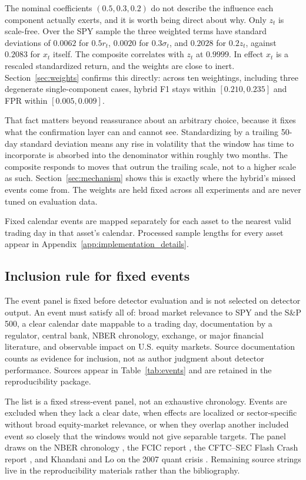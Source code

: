 \documentclass[pdflatex,sn-mathphys-num,iicol]{sn-jnl}
\begin{document}
The nominal coefficients $(0.5,0.3,0.2)$ do not describe the influence each component actually exerts, and it is worth being direct about why. Only $z_t$ is scale-free. Over the SPY sample the three weighted terms have standard deviations of $0.0062$ for $0.5r_t$, $0.0020$ for $0.3\sigma_t$, and $0.2028$ for $0.2z_t$, against $0.2083$ for $x_t$ itself. The composite correlates with $z_t$ at $0.9999$. In effect $x_t$ is a rescaled standardized return, and the weights are close to inert. Section~\ref{sec:weights} confirms this directly: across ten weightings, including three degenerate single-component cases, hybrid F1 stays within $[0.210, 0.235]$ and FPR within $[0.005, 0.009]$.

That fact matters beyond reassurance about an arbitrary choice, because it fixes what the confirmation layer can and cannot see. Standardizing by a trailing 50-day standard deviation means any rise in volatility that the window has time to incorporate is absorbed into the denominator within roughly two months. The composite responds to moves that outrun the trailing scale, not to a higher scale as such. Section~\ref{sec:mechanism} shows this is exactly where the hybrid's missed events come from. The weights are held fixed across all experiments and are never tuned on evaluation data.

Fixed calendar events are mapped separately for each asset to the nearest valid trading day in that asset's calendar. Processed sample lengths for every asset appear in Appendix~\ref{app:implementation_details}.

\subsection{Inclusion rule for fixed events}
The event panel is fixed before detector evaluation and is not selected on detector output. An event must satisfy all of: broad market relevance to SPY and the S\&P 500, a clear calendar date mappable to a trading day, documentation by a regulator, central bank, NBER chronology, exchange, or major financial literature, and observable impact on U.S. equity markets. Source documentation counts as evidence for inclusion, not as author judgment about detector performance. Sources appear in Table~\ref{tab:events} and are retained in the reproducibility package.

The list is a fixed stress-event panel, not an exhaustive chronology. Events are excluded when they lack a clear date, when effects are localized or sector-specific without broad equity-market relevance, or when they overlap another included event so closely that the windows would not give separable targets. The panel draws on the NBER chronology \cite{nber2023}, the FCIC report \cite{fcic2011}, the CFTC--SEC Flash Crash report \cite{cftcsec2010}, and Khandani and Lo on the 2007 quant crisis \cite{khandani2007}. Remaining source strings live in the reproducibility materials rather than the bibliography.
\end{document}
